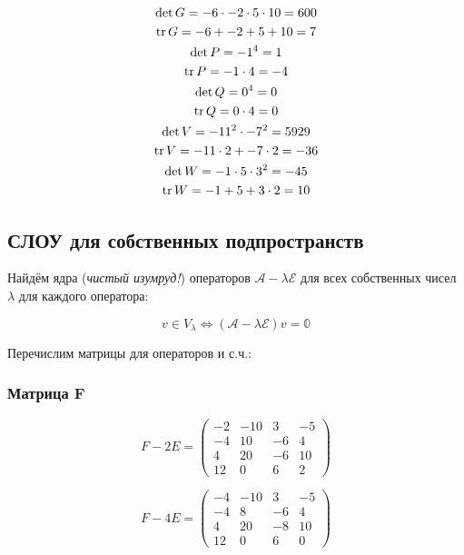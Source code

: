 \documentclass[12pt, a4paper]{article}
\begin{document}
    \begin{gather}
        \det G = -6 \cdot -2 \cdot 5 \cdot 10 = 600 \\
        \operatorname{tr} G = -6 + -2 + 5 + 10 = 7 \\
        \det P = -1^4 = 1 \\
        \operatorname{tr} P = -1 \cdot 4 = -4 \\
        \det Q = 0^4 = 0 \\
        \operatorname{tr} Q = 0 \cdot 4 = 0 \\
        \det V = -11^2 \cdot -7^2 = 5929 \\
        \operatorname{tr} V = -11 \cdot 2 + -7 \cdot 2 = -36 \\
        \det W = -1 \cdot 5 \cdot 3 ^2 = -45 \\
        \operatorname{tr} W = -1 + 5 + 3 \cdot 2 = 10
    \end{gather}

    \subsection{СЛОУ для собственных подпространств}
    
    Найдём ядра (\textit{чистый изумруд!}) операторов $\mathcal{A} - \lambda \mathcal{E}$ 
    для всех собственных чисел $\lambda$ для каждого оператора:

    \begin{equation}
        v \in V_\lambda \Leftrightarrow (\mathcal{A} - \lambda \mathcal{E})v = \mathbb{0}
    \end{equation}

    Перечислим матрицы для операторов и с.ч.:

    \subsubsection{Матрица F}

    \begin{equation}
        F - 2 E = \left(\begin{matrix}
            -2 & -10 & 3 & -5 \\
            -4 & 10 & -6 & 4 \\
            4 & 20 & -6 & 10 \\
            12 & 0 & 6 & 2
        \end{matrix}\right)
    \end{equation}


    \begin{equation}
        F - 4 E = \left(\begin{matrix}
            -4 & -10 & 3 & -5 \\
            -4 & 8 & -6 & 4 \\
            4 & 20 & -8 & 10 \\
            12 & 0 & 6 & 0
        \end{matrix}\right)
    \end{equation}
\end{document}
